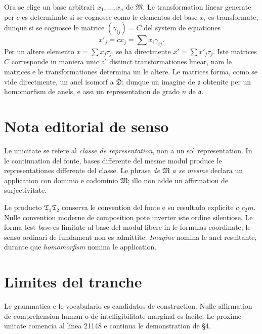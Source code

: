 \documentclass[11pt]{article}
\begin{document}
Ora se elige un base arbitrari $x_1,\ldots,x_n$ de $\mathfrak M$.
Le transformation linear generate per $c$ es determinate si se cognosce como le elementos del base $x_i$ es transformate, dunque si se cognosce le matrice $(\gamma_{ij})=C$ del system de equationes
\[
x'_j=cx_j=\sum x_i\gamma_{ij}.
\]
Per un altere elemento $x=\sum x_j\tau_j$, se ha directmente $x'=\sum x'_j\tau_j$.
Iste matrices $C$ corresponde in maniera unic al distinct transformationes linear, nam le matrices e le transformationes determina un le altere. Le matrices forma, como se vide directmente, un anel isomorf a $\overline{\mathfrak D}$; dunque un imagine de $\mathfrak{o}$ obtenite per un homomorfism de anels, e assi un representation de grado $n$ de $\mathfrak{o}$.

\clearpage
\vspace*{10mm}
\section*{Nota editorial de senso}

Le unicitate se refere al \emph{classe de representation}, non a un sol representation. In le continuation del fonte, bases differente del mesme modul produce le representationes differente del classe. Le phrase \emph{de $\mathfrak M$ a se mesme} declara un application con dominio e codominio $\mathfrak M$; illo non adde un affirmation de surjectivitate.

Le producto $\mathfrak T_1\mathfrak T_2$ conserva le convention del fonte e su resultado explicite $c_1c_2m$. Nulle convention moderne de composition pote inverter iste ordine silentiose. Le forma test \emph{base} es limitate al base del modul libere in le formulas coordinate; le senso ordinari de fundament non es admittite. \emph{Imagine} nomina le anel resultante, durante que \emph{homomorfism} nomina le application.

\section*{Limites del tranche}

Le grammatica e le vocabulario es candidatos de construction. Nulle affirmation de comprehension human o de intelligibilitate marginal es facite. Le proxime unitate comencia al linea 21148 e continua le demonstration de §4.
\end{document}
